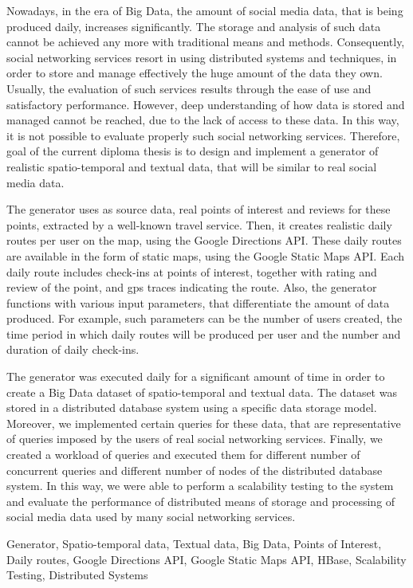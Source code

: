 
\begin{abstracten}%

Nowadays, in the era of Big Data, the amount of social media data, that is being produced daily, increases significantly. The storage and analysis of such data cannot 
be achieved any more with traditional means and methods. Consequently, social networking services resort in using distributed systems and techniques, in order to store 
and manage effectively the huge amount of the data they own. Usually, the evaluation of such services results through the ease of use and satisfactory performance. 
However, deep understanding of how data is stored and managed cannot be reached, due to the lack of access to these data. In this way, it is not possible to 
evaluate properly such social networking services. Therefore, goal of the current diploma thesis is to design and implement a generator of realistic spatio-temporal and 
textual data, that will be similar to real social media data. 

The generator uses as source data, real points of interest and reviews for these points, extracted by a well-known travel service. Then, it creates 
realistic daily routes per user on the map, using the Google Directions API. These daily routes are available in the form of static maps, using the 
Google Static Maps API. Each daily route includes check-ins at points of interest, together with rating and review of the point, and gps traces 
indicating the route. Also, the generator functions with various input parameters, that differentiate the amount of data produced. For example, such parameters 
can be the number of users created, the time period in which daily routes will be produced per user and the number and duration of daily check-ins. 

The generator was executed daily for a significant amount of time in order to create a Big Data dataset of spatio-temporal and textual data. 
The dataset was stored in a distributed database system using a specific data storage model. Moreover, we implemented certain queries for these data, that are 
representative of queries imposed by the users of real social networking services. Finally, we created a workload of queries and executed them for 
different number of concurrent queries and different number of nodes of the distributed database system. In this way, we were able to perform a scalability 
testing to the system and evaluate the performance of distributed means of storage and processing of social media data used by many social networking services.

 \begin{keywordsen}
  Generator, Spatio-temporal data, Textual data, Big Data, Points of Interest, Daily routes, Google Directions API, Google Static Maps API, HBase, 
  Scalability Testing, Distributed Systems
 \end{keywordsen}
\end{abstracten}
